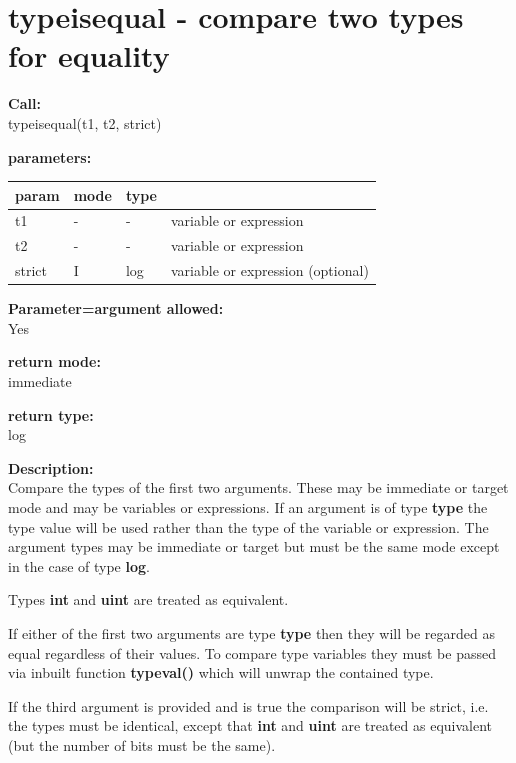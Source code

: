     \section{typeisequal - compare two types for equality}\label{sec:iftypeiseq}
        
        {\bf Call:} \\
        typeisequal(t1, t2, strict)
        
        {\bf parameters:} \\
        \begin{tabular}{| l | l | l | l |}
        \hline
        param  & mode & type & \\
        \hline \hline
        t1     & - &  -    & variable or expression \\ \hline
        t2     & - &  -    & variable or expression \\ \hline
        strict & I &  log  & variable or expression (optional) \\ \hline
        \end{tabular}
        
        {\bf Parameter=argument allowed:} \\
        Yes
        
        {\bf return mode:} \\
        immediate

        {\bf return type:} \\
        log
        
        {\bf Description:} \\
        Compare the types of the first two arguments. These may be
        immediate or target mode and may be variables or expressions.
        If an argument is of type {\bf type} the type value will be used
        rather than the type of the variable or expression. The argument types
        may be immediate or target but must be the same mode except in the case
        of type {\bf log}.
        
        Types {\bf int} and {\bf uint} are treated as equivalent.
        
        If either of the first two arguments are type {\bf type} then they
        will be regarded as equal regardless of their values. To compare
        type variables they must be passed via inbuilt function {\bf typeval()}
        which will unwrap the contained type.
        
        If the third argument is provided and is true the comparison will be
        strict, i.e. the types must be identical, except that {\bf int} and {\bf
        uint} are treated as equivalent (but the number of bits must be the
        same).
        
